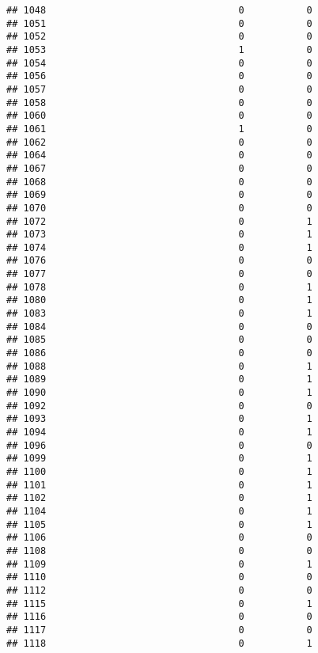 \documentclass[
]{article}
\begin{document}
\begin{verbatim}
## 1048                                  0           0
## 1051                                  0           0
## 1052                                  0           0
## 1053                                  1           0
## 1054                                  0           0
## 1056                                  0           0
## 1057                                  0           0
## 1058                                  0           0
## 1060                                  0           0
## 1061                                  1           0
## 1062                                  0           0
## 1064                                  0           0
## 1067                                  0           0
## 1068                                  0           0
## 1069                                  0           0
## 1070                                  0           0
## 1072                                  0           1
## 1073                                  0           1
## 1074                                  0           1
## 1076                                  0           0
## 1077                                  0           0
## 1078                                  0           1
## 1080                                  0           1
## 1083                                  0           1
## 1084                                  0           0
## 1085                                  0           0
## 1086                                  0           0
## 1088                                  0           1
## 1089                                  0           1
## 1090                                  0           1
## 1092                                  0           0
## 1093                                  0           1
## 1094                                  0           1
## 1096                                  0           0
## 1099                                  0           1
## 1100                                  0           1
## 1101                                  0           1
## 1102                                  0           1
## 1104                                  0           1
## 1105                                  0           1
## 1106                                  0           0
## 1108                                  0           0
## 1109                                  0           1
## 1110                                  0           0
## 1112                                  0           0
## 1115                                  0           1
## 1116                                  0           0
## 1117                                  0           0
## 1118                                  0           1
\end{verbatim}
\end{document}
